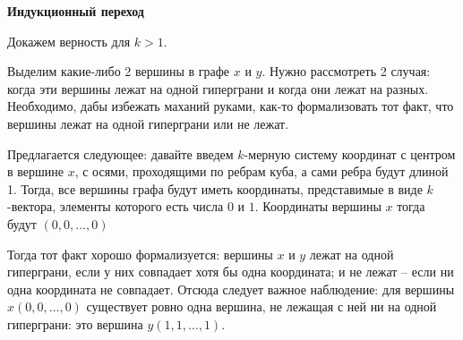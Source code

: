 \documentclass[russian]{article}
\begin{document}
\textbf{Индукционный переход}

Докажем верность для $k>1$.

Выделим какие-либо 2 вершины в графе $x$ и $y$. Нужно рассмотреть 2 случая: когда эти вершины лежат на одной гиперграни и когда они лежат на разных. Необходимо, дабы избежать маханий руками, как-то формализовать тот факт, что вершины лежат на одной гиперграни или не лежат.

Предлагается следующее: давайте введем $k$-мерную систему координат с центром в вершине $x$, с осями, проходящими по ребрам куба, а сами ребра будут длиной 1. Тогда, все вершины графа будут иметь координаты, представимые в виде $k$-вектора, элементы которого есть числа $0$ и $1$. Координаты вершины $x$ тогда будут $(0, 0, \ldots, 0)$

Тогда тот факт хорошо формализуется: вершины $x$ и $y$ лежат на одной гиперграни, если у них совпадает хотя бы одна координата; и не лежат -- если ни одна координата не совпадает. Отсюда следует важное наблюдение: для вершины $x(0, 0, \ldots, 0)$ существует ровно одна вершина, не лежащая с ней ни на одной гиперграни: это вершина $y(1, 1, \ldots, 1)$.
\end{document}
